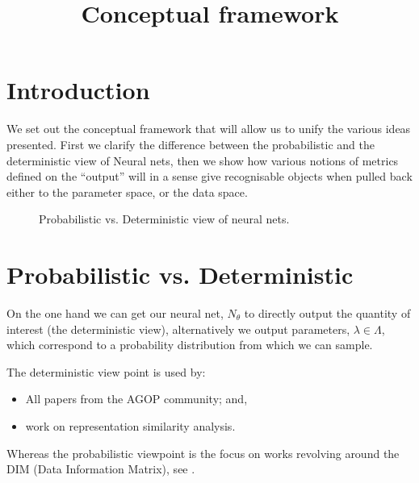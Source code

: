 \documentclass{tufte-handout}
\title{Conceptual framework}
\begin{document}
\maketitle%



\section{Introduction}

We set out the conceptual framework that will allow us to unify the various ideas
presented. First we clarify the difference between the probabilistic and the
deterministic view of Neural nets, then we show how various notions of metrics defined
on the ``output'' will in a sense give recognisable objects when pulled back either to
the parameter space, or the data space.

\begin{figure}[h!]
  \caption{Probabilistic vs. Deterministic view of neural nets.
}

  \label{fig:prob-vs-det}
\end{figure}

\section{Probabilistic vs. Deterministic}

On the one hand we can get our neural net, $N_\theta$ to directly output the quantity of
interest (the deterministic view), alternatively we output parameters, $\lambda \in
\Lambda$, which correspond to a probability distribution from which we can sample.

The deterministic view point is used by:
\begin{itemize}
    \item All papers from the AGOP community\cite[-4cm]{Radhakrishnan2024,DePavia2025}; and,
    \item work on representation similarity analysis\cite{Cayco_Gajic2026}.
\end{itemize}
Whereas the probabilistic viewpoint is the focus on works revolving around the DIM (Data Information Matrix), see \cite{Tron2025}.
\end{document}
